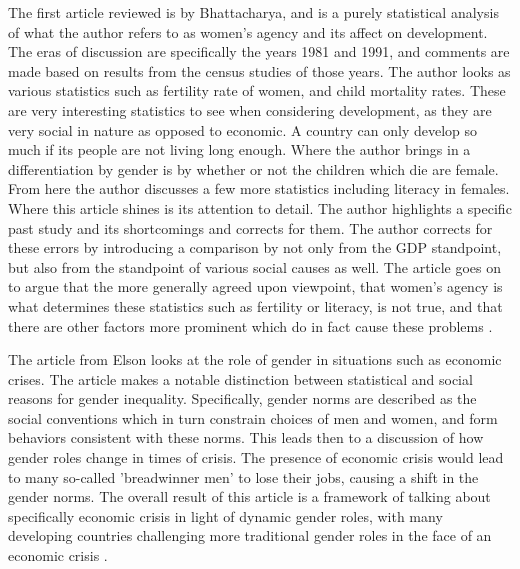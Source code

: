 \documentclass[12pt, letterpaper]{article}
\begin{document}
The first article reviewed is by Bhattacharya, and is a purely statistical analysis of what the author refers to as women's agency and its affect on development. The eras of discussion are specifically the years 1981 and 1991, and comments are made based on results from the census studies of those years. The author looks as various statistics such as fertility rate of women, and child mortality rates. These are very interesting statistics to see when considering development, as they are very social in nature as opposed to economic. A country can only develop so much if its people are not living long enough. Where the author brings in a differentiation by gender is by whether or not the children which die are female. From here the author discusses a few more statistics including literacy in females. Where this article shines is its attention to detail. The author highlights a specific past study and its shortcomings and corrects for them. The author corrects for these errors by introducing a comparison by not only from the GDP standpoint, but also from the standpoint of various social causes as well. The article goes on to argue that the more generally agreed upon viewpoint, that women's agency is what determines these statistics such as fertility or literacy, is not true, and that there are other factors more prominent which do in fact cause these problems \cite{bhatt}.

The article from Elson looks at the role of gender in situations such as economic crises. The article makes a notable distinction between statistical and social reasons for gender inequality. Specifically, gender norms are described as the social conventions which in turn constrain choices of men and women, and form behaviors consistent with these norms. This leads then to a discussion of how gender roles change in times of crisis. The presence of economic crisis would lead to many so-called 'breadwinner men' to lose their jobs, causing a shift in the gender norms. The overall result of this article is a framework of talking about specifically economic crisis in light of dynamic gender roles, with many developing countries challenging more traditional gender roles in the face of an economic crisis \cite{elson}.
\end{document}
